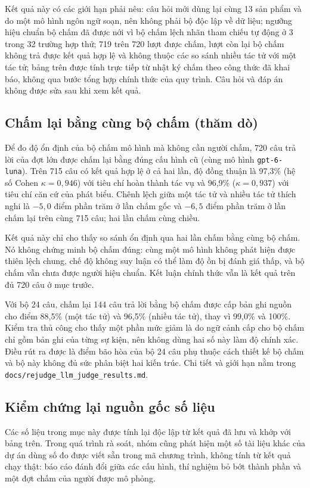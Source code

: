 Kết quả này có các giới hạn phải nêu: câu hỏi mới dùng lại cùng 13 sản phẩm và do một mô hình ngôn ngữ soạn, nên không phải bộ độc lập về dữ liệu; ngưỡng hiệu chuẩn bộ chấm đã được nới vì bộ chấm lệch nhãn tham chiếu tự động ở 3 trong 32 trường hợp thử; 719 trên 720 lượt được chấm, lượt còn lại bộ chấm không trả được kết quả hợp lệ và không thuộc các so sánh nhiều tác tử với một tác tử; bảng trên được tính trực tiếp từ nhật ký chấm theo công thức đã khai báo, không qua bước tổng hợp chính thức của quy trình. Câu hỏi và đáp án không được sửa sau khi xem kết quả.

\subsection{Chấm lại bằng cùng bộ chấm (thăm dò)}
Để đo độ ổn định của bộ chấm mô hình mà không cần người chấm, 720 câu trả lời của đợt lớn được chấm lại bằng đúng cấu hình cũ (cùng mô hình \texttt{gpt-6-luna}). Trên 715 câu có kết quả hợp lệ ở cả hai lần, độ đồng thuận là 97,3\% (hệ số Cohen $\kappa = 0{,}946$) với tiêu chí hoàn thành tác vụ và 96,9\% ($\kappa = 0{,}937$) với tiêu chí căn cứ của phát biểu. Chênh lệch giữa một tác tử và nhiều tác tử thích nghi là $-5{,}0$ điểm phần trăm ở lần chấm gốc và $-6{,}5$ điểm phần trăm ở lần chấm lại trên cùng 715 câu; hai lần chấm cùng chiều.

Kết quả này chỉ cho thấy so sánh ổn định qua hai lần chấm bằng cùng bộ chấm. Nó không chứng minh bộ chấm đúng: cùng một mô hình không phát hiện được thiên lệch chung, chế độ không suy luận có thể làm độ ồn bị đánh giá thấp, và bộ chấm vẫn chưa được người hiệu chuẩn. Kết luận chính thức vẫn là kết quả trên đủ 720 câu ở mục trước.

Với bộ 24 câu, chấm lại 144 câu trả lời bằng bộ chấm được cấp bản ghi nguồn cho điểm 88,5\% (một tác tử) và 96,5\% (nhiều tác tử), thay vì 99,0\% và 100\%. Kiểm tra thủ công cho thấy một phần mức giảm là do ngữ cảnh cấp cho bộ chấm chỉ gồm bản ghi của từng sự kiện, nên không dùng hai số này làm độ chính xác. Điều rút ra được là điểm bão hòa của bộ 24 câu phụ thuộc cách thiết kế bộ chấm và bộ này không đủ sức phân biệt hai kiến trúc. Chi tiết và giới hạn nằm trong \texttt{docs/rejudge\_llm\_judge\_results.md}.

\subsection{Kiểm chứng lại nguồn gốc số liệu}
Các số liệu trong mục này được tính lại độc lập từ kết quả đã lưu và khớp với bảng trên. Trong quá trình rà soát, nhóm cũng phát hiện một số tài liệu khác của dự án dùng số đo được viết sẵn trong mã chương trình, không tính từ kết quả chạy thật: báo cáo đánh đổi giữa các cấu hình, thí nghiệm bỏ bớt thành phần và một đợt chấm của người được mô phỏng. 

